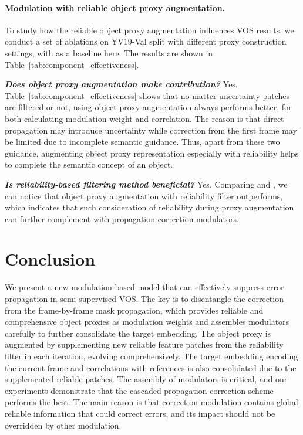 \documentclass[letterpaper]{article} \usepackage{aaai22}  \usepackage{times}  \usepackage{helvet}  \usepackage{courier}  \usepackage[hyphens]{url}  \usepackage{graphicx} \urlstyle{rm} \def\UrlFont{\rm}  \usepackage{natbib}  \usepackage{caption} \DeclareCaptionStyle{ruled}{labelfont=normalfont,labelsep=colon,strut=off} \frenchspacing  \setlength{\pdfpagewidth}{8.5in}  \setlength{\pdfpageheight}{11in}  \usepackage{algorithm}
\newcommand{\tab}[1]{Table~#1}
\begin{document}
\paragraph{Modulation with reliable object proxy augmentation.}
To study how the reliable object proxy augmentation influences VOS results, we conduct a set of ablations on YV19-Val split with different proxy construction settings, with  as a baseline here. The results are shown in \tab{\ref{tab:component_effectiveness}}.

\textbf{\textit{Does object proxy augmentation make contribution?}} Yes. \tab{\ref{tab:component_effectiveness}} shows that no matter uncertainty patches are filtered or not, using object proxy augmentation always performs better, for both calculating modulation weight and correlation. The reason is that direct propagation may introduce uncertainty while correction from the first frame may be limited due to incomplete semantic guidance. Thus, apart from these two guidance, augmenting object proxy representation especially with reliability helps to complete the semantic concept of an object.

\textbf{\textit{Is reliability-based filtering method beneficial?}} Yes. Comparing  and , we can notice that object proxy augmentation with reliability filter outperforms, which indicates that such consideration of reliability during proxy augmentation can further complement with propagation-correction modulators. 
	
\section{Conclusion}
\label{sec:Conclusion}
We present a new modulation-based model that can effectively suppress error propagation in semi-supervised VOS.
The key is to disentangle the correction from the frame-by-frame mask propagation, which provides reliable and comprehensive object proxies as modulation weights and assembles modulators carefully to further consolidate the target embedding.
The object proxy is augmented by supplementing new reliable feature patches from the reliability filter in each iteration, evolving comprehensively. The target embedding encoding the current frame and correlations with references is also consolidated due to the supplemented reliable patches.
The assembly of modulators is critical, and our experiments demonstrate that the cascaded propagation-correction scheme performs the best. 
The main reason is that correction modulation contains global reliable information that could correct errors, and its impact should not be overridden by other modulation. 
\end{document}
